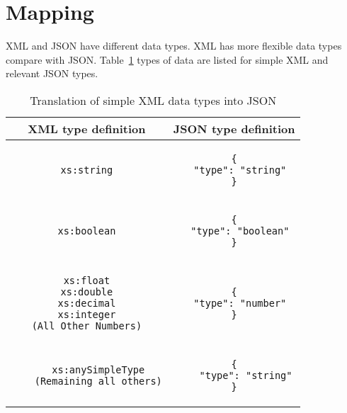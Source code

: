 \section{Mapping}
XML and JSON have different data types. XML has more flexible data types compare with JSON. Table~\ref{tbl:xml-json:types} types of data are listed for simple XML and relevant JSON types.
\begin{longtable}{c|c}
\caption{Translation of simple XML data types into JSON}
\label{tbl:xml-json:types}\\

\textbf{XML type definition} & \textbf{JSON type definition}\\
\hline

\begin{minipage}{.4\textwidth}
  \begin{lstlisting}
xs:string
  \end{lstlisting}
\end{minipage} &
\begin{minipage}{.4\textwidth}
\begin{lstlisting}
{
  "type": "string"
}
\end{lstlisting}
\end{minipage}\\

\hline
\begin{minipage}{.4\textwidth}
  \begin{lstlisting}
xs:boolean
  \end{lstlisting}
\end{minipage} &
\begin{minipage}{.4\textwidth}
\begin{lstlisting}
{
  "type": "boolean"
}
\end{lstlisting}
\end{minipage}\\

\hline
\begin{minipage}{.4\textwidth}
  \begin{lstlisting}
xs:float
xs:double
xs:decimal
xs:integer
(All Other Numbers)
  \end{lstlisting}
\end{minipage} &
\begin{minipage}{.4\textwidth}
\begin{lstlisting}
{
  "type": "number"
}
\end{lstlisting}
\end{minipage}\\
\hline

\begin{minipage}{.4\textwidth}
	\begin{lstlisting}
	xs:anySimpleType
	(Remaining all others)
	\end{lstlisting}
\end{minipage} &
\begin{minipage}{.4\textwidth}
\begin{lstlisting}
{
	"type": "string"
}
\end{lstlisting}
\end{minipage}\\
\end{longtable}


